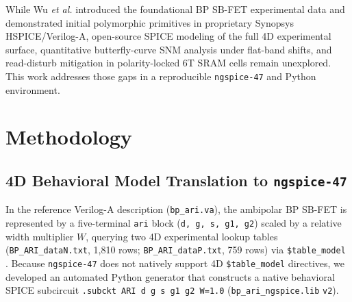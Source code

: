 \documentclass[conference]{IEEEtran}
\begin{document}
While Wu \emph{et al.} \cite{wu2021} introduced the foundational BP SB-FET experimental data and demonstrated initial polymorphic primitives in proprietary Synopsys HSPICE/Verilog-A, open-source SPICE modeling of the full 4D experimental surface, quantitative butterfly-curve SNM analysis under flat-band shifts, and read-disturb mitigation in polarity-locked 6T SRAM cells remain unexplored. This work addresses those gaps in a reproducible \texttt{ngspice-47} and Python environment.

\section{Methodology}
\subsection{4D Behavioral Model Translation to \texttt{ngspice-47}}
In the reference Verilog-A description (\texttt{bp\_ari.va}), the ambipolar BP SB-FET is represented by a five-terminal \texttt{ari} block (\texttt{d, g, s, g1, g2}) scaled by a relative width multiplier $W$, querying two 4D experimental lookup tables (\texttt{BP\_ARI\_\allowbreak dataN.txt}, 1,810 rows; \texttt{BP\_ARI\_\allowbreak dataP.txt}, 759 rows) via \texttt{\$table\_\allowbreak model} \cite{wu2021}. Because \texttt{ngspice-47} does not natively support 4D \texttt{\$table\_\allowbreak model} directives, we developed an automated Python generator that constructs a native behavioral SPICE subcircuit \texttt{.subckt ARI d g s g1 g2 W=1.0} (\texttt{bp\_ari\_\allowbreak ngspice.lib} \texttt{v2}).
\end{document}
